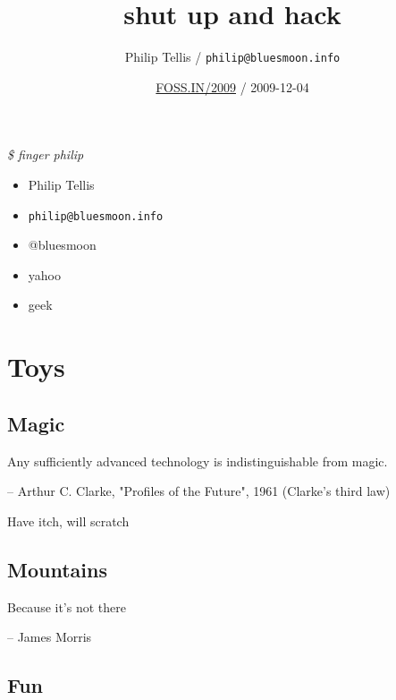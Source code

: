 \documentclass{beamer}
\author{Philip Tellis / \texttt{philip@bluesmoon.info}}
\title{shut up and hack}
\date{\href{http://foss.in/}{FOSS.IN/2009} / 2009-12-04}
\begin{document}
\begin{frame}
  \titlepage
\end{frame}


\begin{frame}{\textit{\$ finger philip}}
  \begin{itemize}
  \item Philip Tellis
  \item \small{\texttt{philip@bluesmoon.info}}
  \item @bluesmoon
  \item yahoo
  \item geek
  \end{itemize}
\end{frame}


\section{Toys}

\subsection{Magic}

\begin{frame}{}
\small{Any sufficiently advanced technology is indistinguishable from magic.}

\hfill \tiny{-- Arthur C. Clarke, "Profiles of the Future", 1961 (Clarke's third law)}
\end{frame}

\begin{frame}{}
\begin{center}
Have itch, will scratch
\end{center}
\end{frame}

\subsection{Mountains}

\begin{frame}{}
\begin{center}Because it's not there\end{center}

\hfill \tiny{-- James Morris}
\end{frame}


\subsection{Fun}
\end{document}
